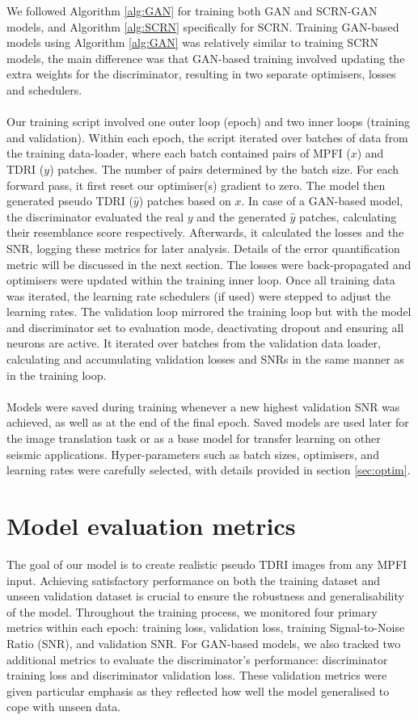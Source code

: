 \noindent We followed Algorithm \ref{alg:GAN} for training both GAN and SCRN-GAN models, and Algorithm \ref{alg:SCRN} specifically for SCRN. Training GAN-based models using Algorithm \ref{alg:GAN} was relatively similar to training SCRN models, the main difference was that GAN-based training involved updating the extra weights for the discriminator, resulting in two separate optimisers, losses and schedulers. 
\\\\
Our training script involved one outer loop (epoch) and two inner loops (training and validation). Within each epoch, the script iterated over batches of data from the training data-loader, where each batch contained pairs of MPFI ($x$) and TDRI ($y$) patches. The number of pairs determined by the batch size. For each forward pass, it first reset our optimiser(s) gradient to zero. The model then generated pseudo TDRI ($\hat{y}$) patches based on $x$. In case of a GAN-based model, the discriminator evaluated the real $y$ and the generated $\hat{y}$ patches, calculating their resemblance score respectively. Afterwards, it calculated the losses and the SNR, logging these metrics for later analysis. Details of the error quantification metric will be discussed in the next section. The losses were back-propagated and optimisers were updated within the training inner loop. Once all training data was iterated, the learning rate schedulers (if used) were stepped to adjust the learning rates. The validation loop mirrored the training loop but with the model and discriminator set to evaluation mode, deactivating dropout and ensuring all neurons are active. It iterated over batches from the validation data loader, calculating and accumulating validation losses and SNRs in the same manner as in the training loop. 
\\\\
Models were saved during training whenever a new highest validation SNR was achieved, as well as at the end of the final epoch. Saved models are used later for the image translation task or as a base model for transfer learning on other seismic applications. Hyper-parameters such as batch sizes, optimisers, and learning rates were carefully selected, with details provided in section \ref{sec:optim}.

\section{Model evaluation metrics}
The goal of our model is to create realistic pseudo TDRI images from any MPFI input. Achieving satisfactory performance on both the training dataset and unseen validation dataset is crucial to ensure the robustness and generalisability of the model. Throughout the training process, we monitored four primary metrics within each epoch: training loss, validation loss, training Signal-to-Noise Ratio (SNR), and validation SNR. For GAN-based models, we also tracked two additional metrics to evaluate the discriminator's performance: discriminator training loss and discriminator validation loss. These validation metrics were given particular emphasis as they reflected how well the model generalised to cope with unseen data.

